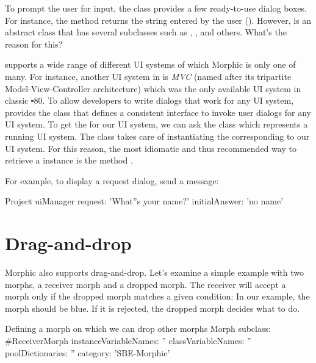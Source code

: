 \documentclass[a4paper,10pt,twoside]{book}
\begin{document}
To prompt the user for input, the  class provides a few ready-to-use dialog boxes.
For instance, the  method returns the string entered by the user ().
However,  is an abstract class that has several subclasses such as , , and others.
What's the reason for this?

\sq supports a wide range of different UI systems of which Morphic is only one of many.
For instance, another UI system in \sq is \emph{MVC} (named after its tripartite Model-View-Controller architecture) which was the only available UI system in classic \st-80.
To allow developers to write dialogs that work for any UI system, \sq provides the  class that defines a consistent interface to invoke user dialogs for any UI system.
To get the  for our UI system, we can ask the class  which represents a running UI system.
The class  takes care of instantiating the  corresponding to our UI system.
For this reason, the most idiomatic and thus recommended way to retrieve a  instance is the method .

For example, to display a request dialog, send a  message:
\begin{code}{}
Project uiManager
	request: 'What''s your name?'
	initialAnswer: 'no name'
\end{code}

\section{Drag-and-drop}

Morphic also supports drag-and-drop.
Let's examine a simple example with two morphs, a receiver morph and a dropped morph. 
The receiver will accept a morph only if the dropped morph matches a given condition:
In our example, the morph should be blue.
If it is rejected, the dropped morph decides what to do.

\begin{classdef}{Defining a morph on which we can drop other morphs}
Morph subclass: #ReceiverMorph
	instanceVariableNames: ''
	classVariableNames: ''
	poolDictionaries: ''
	category: 'SBE-Morphic'
\end{classdef}
\end{document}

